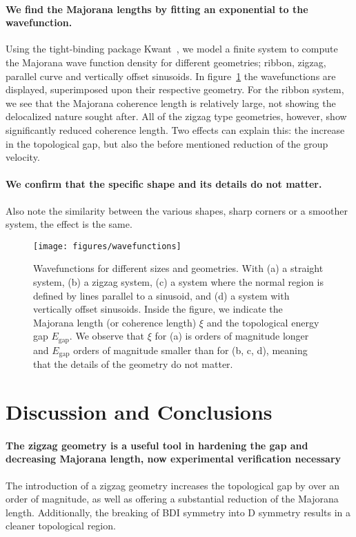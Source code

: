 \documentclass[english, twocolumn, 10pt, aps, superscriptaddress, floatfix, prb, citeautoscript]{revtex4-1}
\renewcommand{\comment}[2]{#2}
\renewcommand{\comment}{\paragraph}
\begin{document}
\comment{We find the Majorana lengths by fitting an exponential to the wavefunction.}
Using the tight-binding package Kwant~\cite{groth_kwant:_2014}, we model a finite system to compute the Majorana wave function density for different geometries; ribbon, zigzag, parallel curve and vertically offset sinusoids.
In figure~\ref{fig:wavefunctions} the wavefunctions are displayed, superimposed upon their respective geometry.
For the ribbon system, we see that the Majorana coherence length is relatively large, not showing the delocalized nature sought after.
All of the zigzag type geometries, however, show significantly reduced coherence length.
Two effects can explain this: the increase in the topological gap, but also the before mentioned reduction of the group velocity.

\comment{We confirm that the specific shape and its details do not matter.}
Also note the similarity between the various shapes, sharp corners or a smoother system, the effect is the same.

\begin{figure}[!htb]
\texttt{[image: figures/wavefunctions]}
\caption{Wavefunctions for different sizes and geometries.
With (a) a straight system, (b) a zigzag system, (c) a system where the normal region is defined by lines parallel to a sinusoid, and (d) a system with vertically offset sinusoids.
Inside the figure, we indicate the Majorana length (or coherence length) $\xi$ and the topological energy gap $E_\textrm{gap}.$
We observe that $\xi$ for (a) is orders of magnitude longer and $E_\textrm{gap}$ orders of magnitude smaller than for (b, c, d), meaning that the details of the geometry do not matter.
\label{fig:wavefunctions}}
\end{figure}

\section{Discussion and Conclusions}

\comment{The zigzag geometry is a useful tool in hardening the gap and decreasing Majorana length, now experimental verification necessary}
The introduction of a zigzag geometry increases the topological gap by over an order of magnitude, as well as offering a substantial reduction of the Majorana length.
Additionally, the breaking of BDI symmetry into D symmetry results in a cleaner topological region.
\end{document}
